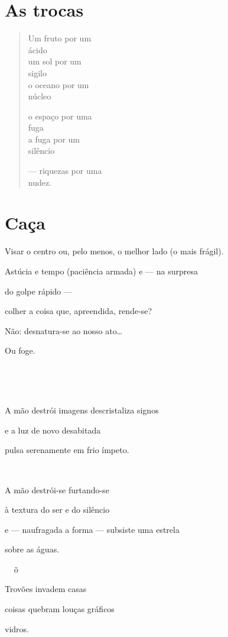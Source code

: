 \chapter{As trocas}

\begin{verse}
Um fruto por um\\
\qquad\qquad ácido\\
um sol por um\\
\qquad\qquad sigilo\\
o oceano por um\\
\qquad\qquad núcleo

o espaço por uma\\
\qquad\qquad fuga\\
a fuga por um\\
\qquad\qquad silêncio

--- riquezas por uma\\
\qquad\qquad nudez.
\end{verse}

\chapter{Caça}

Visar o centro ou, pelo menos, o melhor lado (o mais frágil).

Astúcia e tempo (paciência armada) e --- na surpresa

do golpe rápido ---

colher a coisa que, apreendida, rende-se?

Não: desnatura-se ao nosso ato\ldots{}

Ou foge.

 



A mão destrói imagens descristaliza signos

e a luz de novo desabitada

pulsa serenamente em frio ímpeto.



A mão destrói-se furtando-se

à textura do ser e do silêncio

e --- naufragada a forma --- subsiste uma estrela

sobre as águas.

õ

Trovões invadem casas

coisas quebram louças gráficos

vidros.

